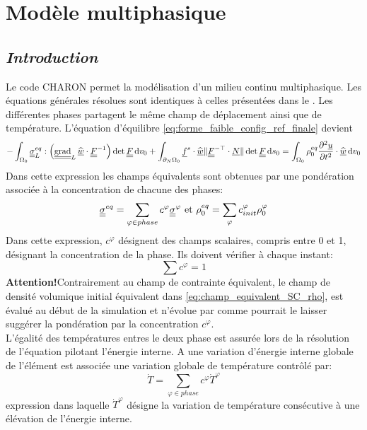 \documentclass[10pt]{book}
\begin{document}
\chapter{Modèle multiphasique}\label{Chapitre:Modèle multiphasique}
\section*{\emph{Introduction}}
Le code CHARON permet la modélisation d'un milieu continu multiphasique. Les équations générales résolues sont identiques à celles présentées dans le . Les différentes phases partagent le même champ de déplacement ainsi que de température. L'équation d'équilibre \eqref{eq:forme_faible_config_ref_finale} devient
$$-\int_{\Configuration_{0}}\SC^{eq}_{L}:\left(\tgrad_{L}\DepVirt\cdot\GT^{-1}\right)\det\GT\dvo+\int_{\dNOm_{0}}\FSurf\cdot\DepVirt\Vert\GT^{-\top}\cdot\NormaleInit\Vert\det\GT\dso=\int_{\Configuration_{0}}\rho_{0}^{eq}\dfrac{\partial^{2}\Dep}{\partial t^{2}}\cdot\DepVirt\dvo$$
Dans cette expression les champs \og équivalents \fg{} sont obtenues par une pondération associée à la concentration de chacune des phases:
\begin{equation}
\underline{\underline{\sigma}}^{eq}=\sum_{\varphi\in phase}c^{\varphi}\underline{\underline{\sigma}}^{\varphi} \text{ et } \rho_{0}^{eq}=\sum_{\varphi}c^{\varphi}_{init}\rho_{0}^{\varphi}
\label{eq:champ_equivalent_SC_rho}
\end{equation}
Dans cette expression, $c^{\varphi}$ désignent des champs scalaires, compris entre 0 et 1, désignant la concentration de la phase. Ils doivent vérifier à chaque instant:
$$\sum c^{\varphi}=1$$
\textbf{Attention!}Contrairement au champ de contrainte équivalent, le champ de densité volumique initial équivalent dans \eqref{eq:champ_equivalent_SC_rho}, est évalué au début de la simulation et n'évolue par comme pourrait le laisser suggérer la pondération par la concentration $c^{\varphi}$.\\

L'égalité des températures entres le deux phase est assurée lors de la résolution de l'équation pilotant l'énergie interne. A une variation d'énergie interne globale de l’élément est associée une variation globale de température contrôlé par:
$$\dot{T}=\sum_{\varphi\in phase}c^{\varphi}\dot{T}^{\varphi}$$
expression dans laquelle $\dot{T}^{\varphi}$ désigne la variation de température consécutive à une élévation de l'énergie interne.
\end{document}
